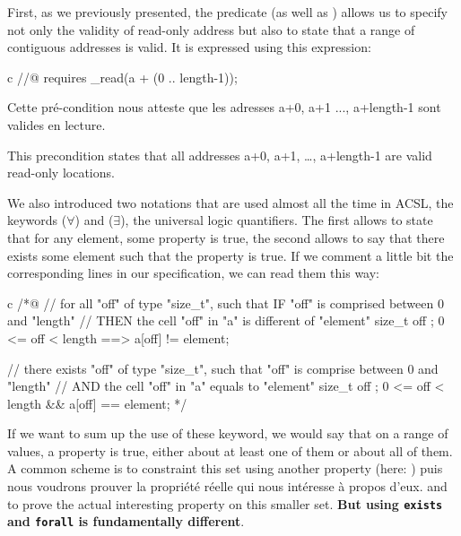 \documentclass[middle]{zmdocument}
\begin{document}
First, as we previously presented, the
 predicate (as well as
) allows us to specify not only the
validity of read-only address but also to state that a range of
contiguous addresses is valid. It is expressed using this expression:



\begin{CodeBlock}{c}
//@ requires \valid_read(a + (0 .. length-1));
\end{CodeBlock}



Cette pré-condition nous atteste que les adresses a+0, a+1 ..., a+length-1 sont
valides en lecture.



This precondition states that all addresses a+0, a+1, \ldots{},
a+length-1 are valid read-only locations.

We also introduced two notations that are used almost all the time in
ACSL, the keywords  ($\forall$) and
 ($\exists$), the universal logic
quantifiers. The first allows to state that for any element, some
property is true, the second allows to say that there exists some
element such that the property is true. If we comment a little bit the
corresponding lines in our specification, we can read them this way:


\begin{CodeBlock}{c}
/*@
// for all "off" of type "size_t", such that IF "off" is comprised between 0 and "length"
//                                 THEN the cell "off" in "a" is different of "element"
\forall size_t off ; 0 <= off < length ==> a[off] != element;

// there exists "off" of type "size_t", such that "off" is comprise between 0 and "length"
//                                      AND the cell "off" in "a" equals to "element"
\exists size_t off ; 0 <= off < length && a[off] == element;
*/
\end{CodeBlock}



If we want to sum up the use of these keyword, we would say that on a
range of values, a property is true, either about at least one of them
or about all of them. A common scheme is to constraint this set using
another property (here: ) puis nous voudrons prouver la
propriété réelle qui nous intéresse à propos d'eux.  and to prove the
actual interesting property on this smaller set. \textbf{But using
\texttt{exists} and \texttt{forall} is fundamentally different}.
\end{document}
